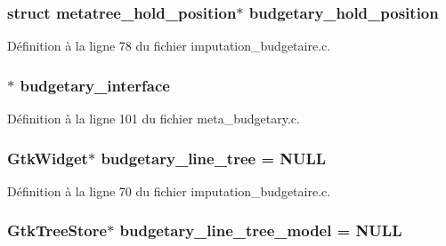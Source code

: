 \subsubsection[{budgetary\_\-hold\_\-position}]{\setlength{\rightskip}{0pt plus 5cm}struct {\bf metatree\_\-hold\_\-position}$\ast$ {\bf budgetary\_\-hold\_\-position}}\label{imputation__budgetaire_8c_ab8cd29b1bed89eccdf93a90305ccf732}


Définition à la ligne 78 du fichier imputation\_\-budgetaire.c.

\subsubsection[{budgetary\_\-interface}]{$\ast$ {\bf budgetary\_\-interface}}\label{imputation__budgetaire_8c_a4b1a6befee9f0036849fd2ad597c7b13}


Définition à la ligne 101 du fichier meta\_\-budgetary.c.

\subsubsection[{budgetary\_\-line\_\-tree}]{\setlength{\rightskip}{0pt plus 5cm}GtkWidget$\ast$ {\bf budgetary\_\-line\_\-tree} = NULL}\label{imputation__budgetaire_8c_a6523d5f68febaef00546d8c2066e0e6d}


Définition à la ligne 70 du fichier imputation\_\-budgetaire.c.

\subsubsection[{budgetary\_\-line\_\-tree\_\-model}]{\setlength{\rightskip}{0pt plus 5cm}GtkTreeStore$\ast$ {\bf budgetary\_\-line\_\-tree\_\-model} = NULL}\label{imputation__budgetaire_8c_ae9ac273826562e08bcc3b6f5ed918a2f}


